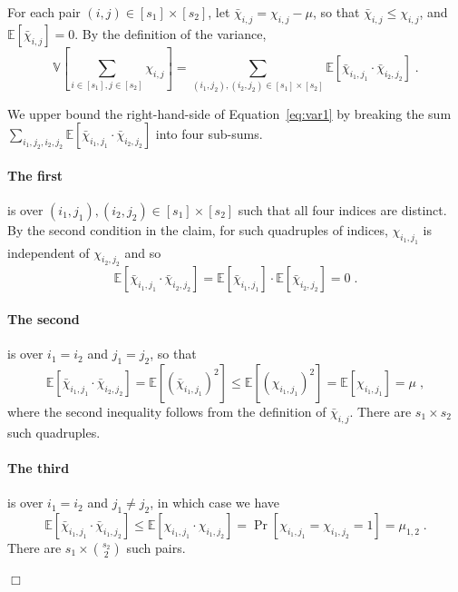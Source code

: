 \documentclass{article}
\newcommand{\Ex}{\mathbb{E}}
\newcommand{\Var}{\mathbb{V}}
\newenvironment{proof}{\smallskip\noindent{\bf Proof:}}%
        {\hspace*{\fill}$\Box$\par}
\begin{document}
\begin{proof}
For each pair $(i,j)\in [s_1]\times [s_2]$,
let $\bar{\chi}_{i,j} = \chi_{i,j} - \mu$, so that $\bar{\chi}_{i,j} \leq \chi_{i,j}$, and
$\Ex[\bar{\chi}_{i,j}] = 0$. By the definition of the variance,
\begin{equation}\label{eq:var1}
\Var\left[\sum_{i\in [s_1],j\in [s_2]}\chi_{i,j}\right] =
  \sum_{(i_1,j_2),(i_2,j_2)\in [s_1]\times[s_2]} \Ex[\bar{\chi}_{i_1,j_1}\cdot \bar{\chi}_{i_2,j_2}]\;.
\end{equation}

We upper bound the right-hand-side of Equation~\eqref{eq:var1} by breaking
 the sum $\sum_{i_1,j_2,i_2,j_2} \Ex[\bar{\chi}_{i_1,j_1}\cdot \bar{\chi}_{i_2,j_2}]$ into four sub-sums.

 \paragraph{The first} is over $(i_1,j_1), (i_2,j_2)\in [s_1]\times [s_2]$ such that all four indices are distinct. By the second condition in the claim, for such quadruples of indices, $\chi_{i_1,j_1}$ is independent of $\chi_{i_2,j_2}$ and so
\begin{equation}\label{eq:cheb-case1}
\Ex[\bar{\chi}_{i_1,j_1}\cdot \bar{\chi}_{i_2,j_2}] =  \Ex[\bar{\chi}_{i_1,j_1}]\cdot \Ex[\bar{\chi}_{i_2,j_2}] = 0\;.
\end{equation}

\paragraph{The second} is over $i_1 = i_2$ and $j_1 = j_2$, so that
\begin{equation}\label{eq:cheb-case2}
\Ex[\bar{\chi}_{i_1,j_1}\cdot \bar{\chi}_{i_2,j_2}] = \Ex[(\bar{\chi}_{i_1,j_1})^2]
\leq \Ex[(\chi_{i_1,j_1})^2] = \Ex[\chi_{i_1,j_1}] = \mu \;,
\end{equation}
where the second inequality follows from the definition of $\bar{\chi}_{i,j}$.
There are $s_1\times s_2$ such quadruples.

\paragraph{The third} is over $i_1 = i_2$ and $j_1 \neq j_2$, in which case we have
\begin{equation}\label{eq:cheb-case3}
\Ex[\bar{\chi}_{i_1,j_1}\cdot \bar{\chi}_{i_1,j_2}]
\leq \Ex[\chi_{i_1,j_1}\cdot \chi_{i_1,j_2}] = \Pr[\chi_{i_1,j_1}=\chi_{i_1,j_2}=1]
  = \mu_{1,2}\;.
\end{equation}
There are $s_1\times {s_2\choose 2}$ such pairs.


\end{proof}
\end{document}
